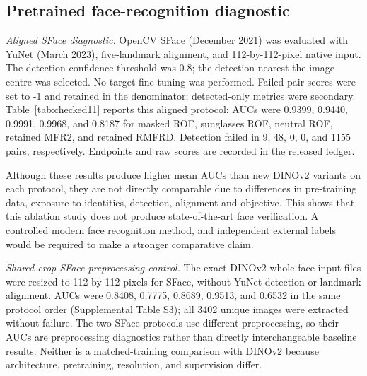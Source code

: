 \documentclass[10pt,lettersize,journal]{IEEEtran}
\begin{document}
\subsection{Pretrained face-recognition diagnostic}
\textit{Aligned SFace diagnostic.} OpenCV SFace \cite{sface} (December 2021) was evaluated with YuNet \cite{yunet} (March 2023), five-landmark alignment, and 112-by-112-pixel native input. The detection confidence threshold was 0.8; the detection nearest the image centre was selected. No target fine-tuning was performed. Failed-pair scores were set to -1 and retained in the denominator; detected-only metrics were secondary. Table~\ref{tab:checked11} reports this aligned protocol: AUCs were 0.9399, 0.9440, 0.9991, 0.9968, and 0.8187 for masked ROF, sunglasses ROF, neutral ROF, retained MFR2, and retained RMFRD. Detection failed in 9, 48, 0, 0, and 1155 pairs, respectively. Endpoints and raw scores are recorded in the released ledger.\par
Although these results produce higher mean AUCs than new DINOv2 variants on each protocol, they are not directly comparable due to differences in pre-training data, exposure to identities, detection, alignment and objective. This shows that this ablation study does not produce state-of-the-art face verification. A controlled modern face recognition method, and independent external labels would be required to make a stronger comparative claim.\par
\begin{table}[t]\centering
\caption{Aligned SFace diagnostic with YuNet detection and five-landmark alignment. Failed pairs receive score -1 and remain in the denominator. These are not the shared-crop SFace results (Supplemental Table S3); differences in pretraining and preprocessing prevent a controlled architecture comparison.}
\label{tab:checked11}
\footnotesize\setlength{\tabcolsep}{2pt}
\ifdim\wd\uploadedtablebox>\columnwidth\resizebox{\columnwidth}{!}{\usebox{\uploadedtablebox}}\else\usebox{\uploadedtablebox}\fi
\end{table}
\textit{Shared-crop SFace preprocessing control.} The exact DINOv2 whole-face input files were resized to 112-by-112 pixels for SFace, without YuNet detection or landmark alignment. AUCs were 0.8408, 0.7775, 0.8689, 0.9513, and 0.6532 in the same protocol order (Supplemental Table S3); all 3402 unique images were extracted without failure. The two SFace protocols use different preprocessing, so their AUCs are preprocessing diagnostics rather than directly interchangeable baseline results. Neither is a matched-training comparison with DINOv2 because architecture, pretraining, resolution, and supervision differ.\par
\end{document}

